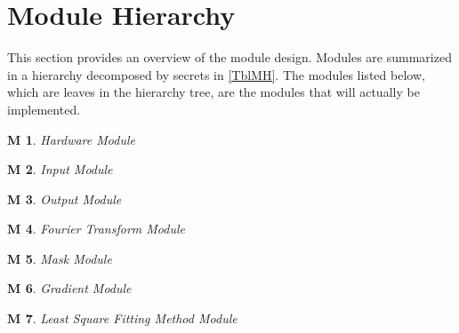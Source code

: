 \documentclass[12pt, titlepage]{article}
\newcounter{ucnum}
\newcommand{\uctheucnum}{UC\theucnum}
\newcounter{mnum}
\newcommand{\mthemnum}{M\themnum}
\newtheorem{M}{M}
\begin{document}

\section{Module Hierarchy} \label{SecMH}

This section provides an overview of the module design. Modules are summarized
in a hierarchy decomposed by secrets in \cref{TblMH}. The modules listed
below, which are leaves in the hierarchy tree, are the modules that will
actually be implemented.

\begin{M}\normalfont Hardware Module
\label{M_Hardware}
\end{M}

\begin{M}\normalfont Input Module
\label{M_InputFormat}
\end{M}

\begin{M}\normalfont Output Module
\label{M_Output}
\end{M}

\begin{M}\normalfont Fourier Transform Module
\label{M_FT}
\end{M}

\begin{M}\normalfont Mask Module
\label{M_Mask}
\end{M}

\begin{M}\normalfont Gradient Module
\label{M_Gradient}
\end{M}

\begin{M}\normalfont Least Square Fitting Method Module
\label{M_LSFM}
\end{M}
\end{document}
